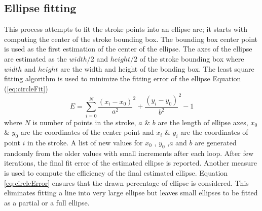 \documentclass[preprint,10pt,5p,twocolumn]{elsarticle}
\begin{document}
\subsection{Ellipse fitting}
This process attempts to fit the stroke points into an ellipse arc; it starts with computing the center of the stroke bounding box. The bounding box center point is used as the first estimation of the center of the ellipse. The axes of the ellipse are estimated as the $width/2$ and $height/2$ of the stroke bounding box where $width$ and $height$ are the width and height of the bonding box. The least square fitting algorithm \cite{chernov} is used to minimize the fitting error of the ellipse Equation (\ref{eq:circleFit})  
\begin{equation}
E = \sum\limits_{i = 0}^N {\frac{{(x_i - x_0 )}}{{a^2 }}^2  + \frac{{(y_i - y_0 )}}{{b^2 }}^2  - 1} 
\label{eq:circleFit}
\end{equation}
where $N$ is number of points in the stroke, $a$ \& $b$ are the length of ellipse axes, $x_0$ \& $y_0$ are the coordinates of the center point and $x_i$ \& $y_i$ are the coordinates of point $i$ in the stroke. A list of new values for $x_0$ , $y_0$ ,$a$ and $b$ are generated randomly from the older values with small increments after each loop.  After few iterations, the final fit error of the estimated ellipse is reported. Another measure is used to compute the efficiency of the final estimated ellipse. Equation \ref{eq:circleError} ensures that the drawn percentage of ellipse is considered. This eliminates fitting a  line into very large ellipse but leaves small ellipses to be fitted as a partial or a full ellipse. 
\end{document}

